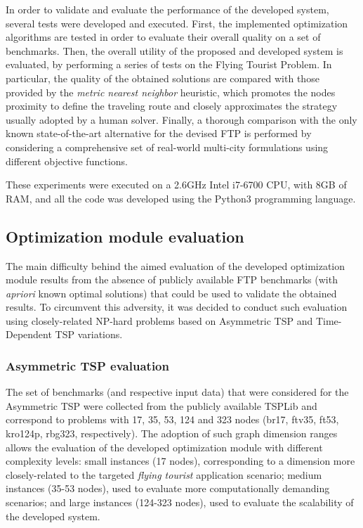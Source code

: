 \documentclass[onecolumn]{elsarticle}
\begin{document}
In order to validate and evaluate the performance of the developed system, several tests were developed and executed. First, the implemented optimization algorithms are tested in order to evaluate their overall quality on a set of benchmarks. Then, the overall utility of the proposed and developed system is evaluated, by performing a series of tests on the Flying Tourist Problem. In particular, the quality of the obtained solutions are compared with those provided by the \textit{metric nearest neighbor} heuristic, which promotes the nodes proximity to define the traveling route and closely approximates the strategy usually adopted by a human solver. Finally, a thorough comparison with the only known state-of-the-art alternative for the devised FTP is performed by considering a comprehensive set of real-world multi-city formulations using different objective functions.

These experiments were executed on a 2.6GHz Intel i7-6700 CPU, with 8GB of RAM, and all the code was developed using the Python3 programming language. 


\subsection{Optimization module evaluation}

The main difficulty behind the aimed evaluation of the developed optimization module results from the absence of publicly available FTP benchmarks (with \textit{apriori} known optimal solutions) that could be used to validate the obtained results. To circumvent this adversity, it was decided to conduct such evaluation using closely-related NP-hard problems based on Asymmetric TSP and Time-Dependent TSP variations.


\subsubsection{Asymmetric TSP evaluation}

The set of benchmarks (and respective input data) that were considered for the Asymmetric TSP were collected from the publicly available TSPLib and correspond to problems with 17, 35, 53, 124 and 323 nodes (br17, ftv35, ft53, kro124p, rbg323, respectively). The adoption of such graph dimension ranges allows the evaluation of the developed optimization module with different complexity levels: small instances (17 nodes), corresponding to a dimension more closely-related to the targeted \textit{flying tourist} application scenario; medium instances (35-53 nodes), used to evaluate more computationally demanding scenarios; and large instances (124-323 nodes), used to evaluate the scalability of the developed system.
\end{document}
